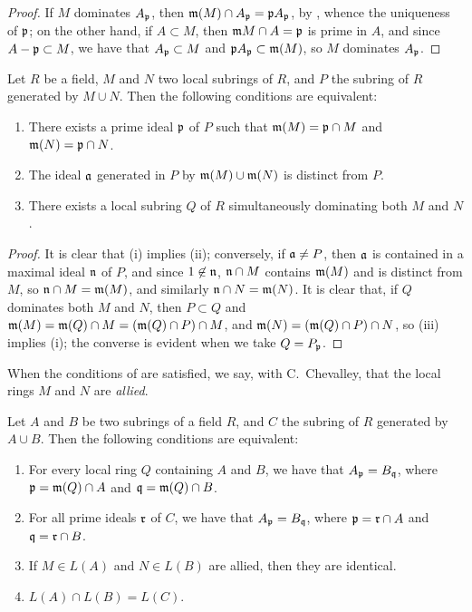 \begin{proof}
\label{proof-1.8.1.3}
If $M$ dominates $A_\mathfrak{p}$, then
$\mathfrak{m}(M)\cap A_\mathfrak{p}=\mathfrak{p}A_\mathfrak{p}$,
by , whence the uniqueness of $\mathfrak{p}$; on the other hand,
if $A\subset M$, then $\mathfrak{m}M\cap A=\mathfrak{p}$ is prime in $A$, and since
$A-\mathfrak{p}\subset M$, we have that $A_\mathfrak{p}\subset M$ and
$\mathfrak{p}A_\mathfrak{p}\subset\mathfrak{m}(M)$, so $M$ dominates
$A_\mathfrak{p}$.
\end{proof}

\begin{lem}[8.1.4]
\label{1.8.1.4}
Let $R$ be a field, $M$ and $N$ two local subrings of $R$, and $P$ the subring of $R$
generated by $M\cup N$. Then the following conditions are equivalent:
\begin{enumerate}[label={\rm(\roman*)}]
  \item There exists a prime ideal $\mathfrak{p}$ of $P$ such that
    $\mathfrak{m}(M)=\mathfrak{p}\cap M$ and $\mathfrak{m}(N)=\mathfrak{p}\cap N$.
  \item The ideal $\mathfrak{a}$ generated in $P$ by $\mathfrak{m}(M)\cup\mathfrak{m}(N)$ is
    distinct from $P$.
  \item There exists a local subring $Q$ of $R$ simultaneously dominating both $M$ and $N$.
\end{enumerate}
\end{lem}

\begin{proof}
\label{proof-1.8.1.4}
It is clear that (i) implies (ii); conversely, if $\mathfrak{a}\neq P$, then
$\mathfrak{a}$ is contained in a maximal ideal $\mathfrak{n}$ of $P$, and since
$1\not\in\mathfrak{n}$, $\mathfrak{n}\cap M$ contains $\mathfrak{m}(M)$ and is
distinct from $M$, so $\mathfrak{n}\cap M=\mathfrak{m}(M)$, and similarly
$\mathfrak{n}\cap N=\mathfrak{m}(N)$. It is clear that, if $Q$ dominates both
$M$ and $N$, then $P\subset Q$ and
$\mathfrak{m}(M)=\mathfrak{m}(Q)\cap M=(\mathfrak{m}(Q)\cap P)\cap M$, and
$\mathfrak{m}(N)=(\mathfrak{m}(Q)\cap P)\cap N$, so (iii) implies (i); the converse
is evident when we take $Q=P_\mathfrak{p}$.
\end{proof}

When the conditions of  are satisfied, we say, with C.~Chevalley,
that the local rings $M$ and $N$ are {\em allied}.

\begin{prop}[8.1.5]
\label{1.8.1.5}
Let $A$ and $B$ be two subrings of a field $R$,
and $C$ the subring of $R$ generated by $A\cup B$. Then the following
conditions are equivalent:
\begin{enumerate}[label={\rm(\roman*)}]
  \item For every local ring $Q$ containing $A$ and $B$, we have that
    $A_\mathfrak{p}=B_\mathfrak{q}$, where $\mathfrak{p}=\mathfrak{m}(Q)\cap A$ and
    $\mathfrak{q}=\mathfrak{m}(Q)\cap B$.
  \item For all prime ideals $\mathfrak{r}$ of $C$, we have that
    $A_\mathfrak{p}=B_\mathfrak{q}$, where $\mathfrak{p}=\mathfrak{r}\cap A$ and
    $\mathfrak{q}=\mathfrak{r}\cap B$.
  \item If $M\in L(A)$ and $N\in L(B)$ are allied, then they are identical.
  \item $L(A)\cap L(B)=L(C)$.
\end{enumerate}
\end{prop}

